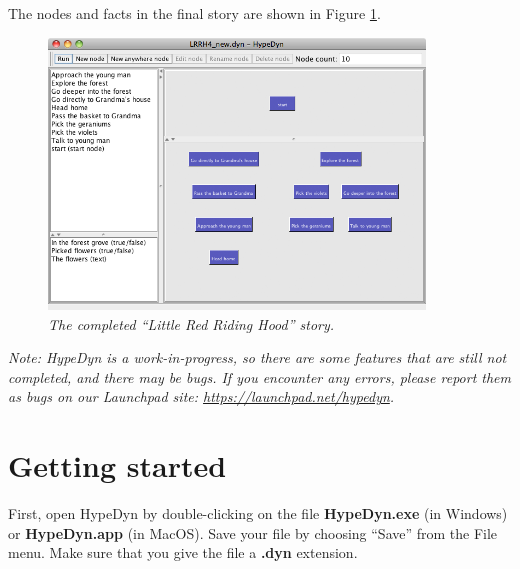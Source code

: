 \documentclass{article}
\begin{document}

The nodes and facts in the final story are shown in Figure
\ref{fig:tut3:completed}.

\begin{figure}[h]
  \centering
  \includegraphics[width=10cm]{images/hypedyn-tutorial-3-figure-1}
  \caption{\textit{The completed ``Little Red Riding Hood'' story.}}
  \label{fig:tut3:completed}
\end{figure} 

\textit{Note:  HypeDyn is a work-in-progress, so there are some features that are still
not completed, and there may be bugs. If you encounter any errors, please
report them as bugs on our Launchpad site: \url{https://launchpad.net/hypedyn}.}

\section{Getting started}


First, open HypeDyn by double-clicking on the file \textbf{HypeDyn.exe} (in
Windows) or \textbf{HypeDyn.app} (in MacOS). Save your file by choosing ``Save''
from the File menu. Make sure that you give the file a \textbf{.dyn} extension.
\end{document}
